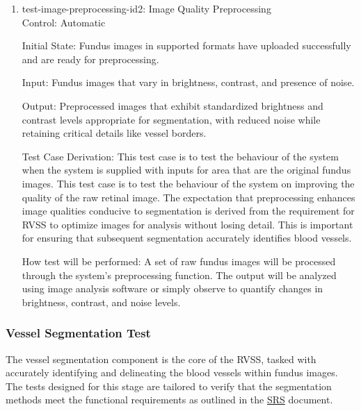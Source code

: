 \documentclass[12pt, titlepage]{article}
\begin{document}
\begin{enumerate}
\item{test-image-preprocessing-id2: Image Quality Preprocessing\\}
\label{test-id-2}
Control: Automatic 
					
Initial State: Fundus images in supported formats have uploaded successfully and are ready for preprocessing.
					
Input: Fundus images that vary in brightness, contrast, and presence of noise.
					
Output: Preprocessed images that exhibit standardized brightness and contrast levels appropriate for segmentation, with reduced noise while retaining critical details like vessel borders.

Test Case Derivation: This test case is to test the behaviour of the system when the system is supplied with inputs for area that are the original fundus images. This test case is to test the behaviour of the system on improving the quality of the raw retinal image. The expectation that preprocessing enhances image qualities conducive to segmentation is derived from the requirement for RVSS to optimize images for analysis without losing detail. This is important for ensuring that subsequent segmentation accurately identifies blood vessels.

How test will be performed: A set of raw fundus images will be processed through the system's preprocessing function. The output will be analyzed using image analysis software or simply observe to quantify changes in brightness, contrast, and noise levels. 
\end{enumerate}


\subsubsection{Vessel Segmentation Test}
\label{vessel_segmentation}
The vessel segmentation component is the core of the RVSS, tasked with accurately identifying and delineating the blood vessels within fundus images. The tests designed for this stage are tailored to verify that the segmentation methods meet the functional requirements as outlined in the \href{https://github.com/lele0007/Blood-vessel-segmentation/blob/main/docs/SRS/SRS.pdf}{SRS} document.
\end{document}
